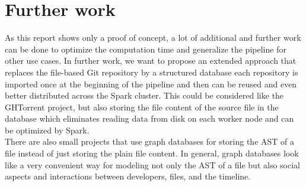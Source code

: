 \documentclass[conference]{IEEEtran}
\begin{document}
\section{Further work}
As this report shows only a proof of concept, a lot of additional and further work can be done to optimize the computation time and generalize the pipeline for other use cases. In further work, we want to propose an extended approach that replaces the file-based Git repository by a structured database each repository is imported once at the beginning of the pipeline and then can be reused and even better distributed across the Spark cluster. This could be considered like the GHTorrent project, but also storing the file content of the source file in the database which eliminates reading data from disk on each worker node and can be optimized by Spark. \\
There are also small projects that use graph databases for storing the AST of a file instead of just storing the plain file content. In general, graph databases look like a very convenient way for modeling not only the AST of a file but also social aspects and interactions between developers, files, and the timeline.


\end{document}
